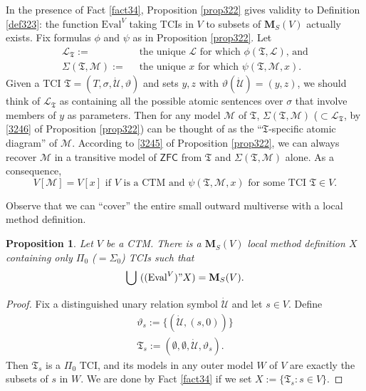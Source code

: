 \documentclass[12pt, twoside]{memoir}
\numberwithin{equation}{section}
\newtheorem{prop}[thm]{Proposition}
\theoremstyle{definition}
\theoremstyle{remark}
\theoremstyle{definition}
\theoremstyle{definition}
\theoremstyle{definition}
\theoremstyle{remark}
\begin{document}
In the presence of Fact \ref{fact34}, Proposition \ref{prop322} gives validity to Definition \ref{def323}: the function $\mathrm{Eval}^V$ taking TCIs in $V$ to subsets of $\mathbf{M}_S(V)$ actually exists. Fix formulas $\phi$ and $\psi$ as in Proposition \ref{prop322}. Let 
\begin{align*}
    \mathcal{L}_{\mathfrak{T}} := \ & \text{ the unique } \mathcal{L} \text{ for which } \phi(\mathfrak{T}, \mathcal{L}) \text{, and} \\
    \Sigma(\mathfrak{T}, \mathcal{M}) := \ & \text{ the unique } x \text{ for which } \psi(\mathfrak{T}, \mathcal{M}, x) \text{.}
\end{align*}
Given a TCI $\mathfrak{T} = (T, \sigma, \dot{\mathcal{U}}, \vartheta)$ and sets $y, z$ with $\vartheta(\dot{\mathcal{U}}) = (y, z)$, we should think of $\mathcal{L}_{\mathfrak{T}}$ as containing all the possible atomic sentences over $\sigma$ that involve members of $y$ as parameters. Then for any model $\mathcal{M}$ of $\mathfrak{T}$, $\Sigma(\mathfrak{T}, \mathcal{M})$ ($\subset \mathcal{L}_{\mathfrak{T}}$, by \ref{3246} of Proposition \ref{prop322}) can be thought of as the ``$\mathfrak{T}$-specific atomic diagram''  of $\mathcal{M}$. According to \ref{3245} of Proposition \ref{prop322}, we can always recover $\mathcal{M}$ in a transitive model of $\mathsf{ZFC}$ from $\mathfrak{T}$ and $\Sigma(\mathfrak{T}, \mathcal{M})$ alone. As a consequence, 
\begin{equation*}
    V[\mathcal{M}] = V[x] \text{ if } V \text{ is a CTM and } \psi(\mathfrak{T}, \mathcal{M}, x) \text{ for some TCI } \mathfrak{T} \in V \text{.}
\end{equation*}

Observe that we can ``cover'' the entire small outward multiverse with a local method definition.

\begin{prop}\label{prop326}
Let $V$ be a CTM. There is a $\mathbf{M}_S(V)$ local method definition $X$ containing only $\Pi_0$ ($= \Sigma_0$) TCIs such that 
\begin{equation*}
    \bigcup \ ((\mathrm{Eval}^V)" X) = \mathbf{M}_S(V) \text{.}
\end{equation*}
\end{prop}

\begin{proof}
Fix a distinguished unary relation symbol $\dot{\mathcal{U}}$ and let $s \in V$. Define 
\begin{gather*}
    \vartheta_s := \{(\dot{\mathcal{U}}, (s, 0))\} \\
    \mathfrak{T}_s := (\emptyset, \emptyset, \dot{\mathcal{U}}, \vartheta_s) \text{.}
\end{gather*}
Then $\mathfrak{T}_s$ is a $\Pi_0$ TCI, and its models in any outer model $W$ of $V$ are exactly the subsets of $s$ in $W$. We are done by Fact \ref{fact34} if we set $X := \{\mathfrak{T}_s : s \in V\}$.
\end{proof}
\end{document}
